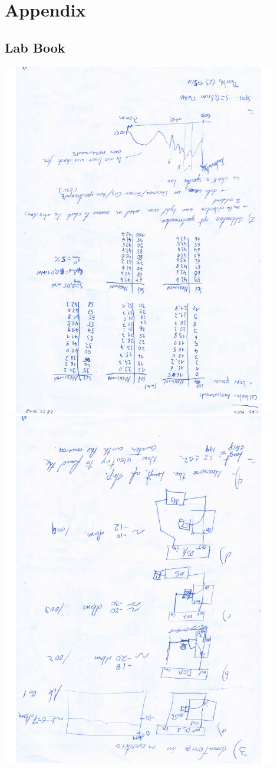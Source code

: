 \section{Appendix}
\subsection{Lab Book}
\centering
\includegraphics[width=0.9\textwidth,angle=180]{../labbook/labbook-1.pdf}
\includegraphics[width=0.9\textwidth,angle=180]{../labbook/labbook-2.pdf}
